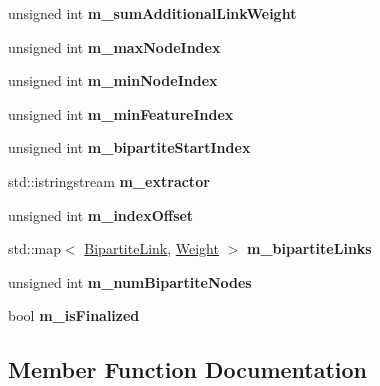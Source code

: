 \begin{DoxyCompactItemize}
unsigned int {\bfseries m\+\_\+sum\+Additional\+Link\+Weight}
\item 
\mbox{\label{classNetwork_a5de3bef1bba7450b72a17f556aaaa1b4}} 
unsigned int {\bfseries m\+\_\+max\+Node\+Index}
\item 
\mbox{\label{classNetwork_a39c79f64f435a5ee02ebd6585d7658fe}} 
unsigned int {\bfseries m\+\_\+min\+Node\+Index}
\item 
\mbox{\label{classNetwork_a3233fe41d3c488944b724c125549480a}} 
unsigned int {\bfseries m\+\_\+min\+Feature\+Index}
\item 
\mbox{\label{classNetwork_a2597b393fbfad6333d51ed9f6464ea93}} 
unsigned int {\bfseries m\+\_\+bipartite\+Start\+Index}
\item 
\mbox{\label{classNetwork_a6c09a5df251f92e45420a852ff0408a5}} 
std\+::istringstream {\bfseries m\+\_\+extractor}
\item 
\mbox{\label{classNetwork_a9576e46072b091e3a97d4e5303512e72}} 
unsigned int {\bfseries m\+\_\+index\+Offset}
\item 
\mbox{\label{classNetwork_a0889972bee522f5b3a8f39fc0769f29f}} 
std\+::map$<$ \mbox{\hyperlink{structBipartiteLink}{Bipartite\+Link}}, \mbox{\hyperlink{structWeight}{Weight}} $>$ {\bfseries m\+\_\+bipartite\+Links}
\item 
\mbox{\label{classNetwork_a088ea8185bc99389e16725dc405a483f}} 
unsigned int {\bfseries m\+\_\+num\+Bipartite\+Nodes}
\item 
\mbox{\label{classNetwork_a7536a6430df2349c3b3775bd4407be96}} 
bool {\bfseries m\+\_\+is\+Finalized}
\end{DoxyCompactItemize}


\subsection{Member Function Documentation}
\mbox{\label{classNetwork_a234269b2addadc7c79f8c0cc43b0b960}} 
